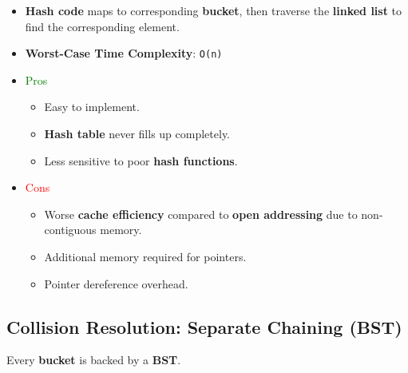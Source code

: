 \documentclass[12pt, letterpaper]{article}
\begin{document}
\begin{itemize}
    \item \textbf{Hash code} maps to corresponding \textbf{bucket}, then traverse the \textbf{linked list} to find the corresponding element.
    \item \textbf{Worst-Case Time Complexity}: \texttt{O(n)}
    \item \textcolor{green}{Pros}
        \begin{itemize}
            \item Easy to implement.
            \item \textbf{Hash table} never fills up completely.
            \item Less sensitive to poor \textbf{hash functions}.
        \end{itemize}
    \item \textcolor{red}{Cons}
        \begin{itemize}
            \item Worse \textbf{cache efficiency} compared to \textbf{open addressing} due to non-contiguous memory.
            \item Additional memory required for pointers.
            \item Pointer dereference overhead.
        \end{itemize}
\end{itemize}

\subsection*{Collision Resolution: Separate Chaining (BST)}

Every \textbf{bucket} is backed by a \textbf{BST}.
\end{document}

